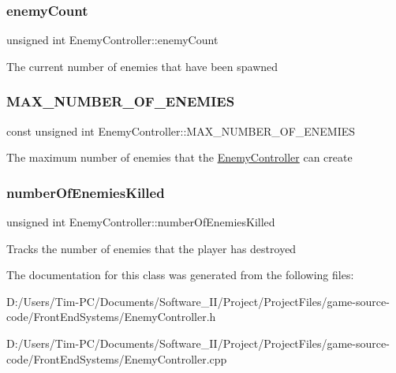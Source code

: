 \subsubsection{\texorpdfstring{enemy\+Count}{enemyCount}}
{\footnotesize\ttfamily unsigned int Enemy\+Controller\+::enemy\+Count\hspace{0.3cm}{\ttfamily [private]}}

The current number of enemies that have been spawned \mbox{\label{class_enemy_controller_aca04264b909526dadc67a41f8c826aee}} 
\subsubsection{\texorpdfstring{M\+A\+X\+\_\+\+N\+U\+M\+B\+E\+R\+\_\+\+O\+F\+\_\+\+E\+N\+E\+M\+I\+ES}{MAX\_NUMBER\_OF\_ENEMIES}}
{\footnotesize\ttfamily const unsigned int Enemy\+Controller\+::\+M\+A\+X\+\_\+\+N\+U\+M\+B\+E\+R\+\_\+\+O\+F\+\_\+\+E\+N\+E\+M\+I\+ES\hspace{0.3cm}{\ttfamily [private]}}

The maximum number of enemies that the \hyperlink{class_enemy_controller}{Enemy\+Controller} can create \mbox{\label{class_enemy_controller_a2b2fdb5b40b75f719838da0386861da5}} 
\subsubsection{\texorpdfstring{number\+Of\+Enemies\+Killed}{numberOfEnemiesKilled}}
{\footnotesize\ttfamily unsigned int Enemy\+Controller\+::number\+Of\+Enemies\+Killed\hspace{0.3cm}{\ttfamily [private]}}

Tracks the number of enemies that the player has destroyed 

The documentation for this class was generated from the following files\+:\begin{DoxyCompactItemize}
\item 
D\+:/\+Users/\+Tim-\/\+P\+C/\+Documents/\+Software\+\_\+\+I\+I/\+Project/\+Project\+Files/game-\/source-\/code/\+Front\+End\+Systems/Enemy\+Controller.\+h\item 
D\+:/\+Users/\+Tim-\/\+P\+C/\+Documents/\+Software\+\_\+\+I\+I/\+Project/\+Project\+Files/game-\/source-\/code/\+Front\+End\+Systems/Enemy\+Controller.\+cpp\end{DoxyCompactItemize}
